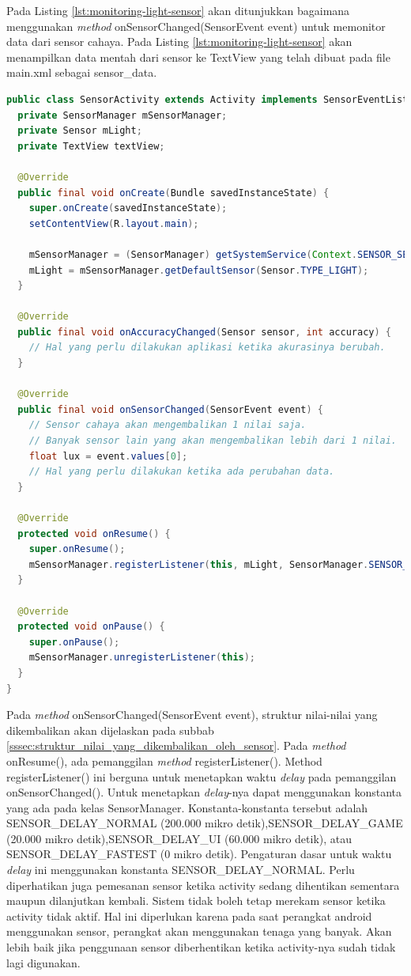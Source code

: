 Pada Listing \ref{lst:monitoring-light-sensor} akan ditunjukkan bagaimana menggunakan \textit{method} onSensorChanged(SensorEvent event) untuk memonitor data dari sensor cahaya. Pada Listing \ref{lst:monitoring-light-sensor} akan menampilkan data mentah dari sensor ke TextView yang telah dibuat pada file main.xml sebagai sensor\_data.
\begin{lstlisting}[caption={Contoh memonitor data mentah pada sensor cahaya},label={lst:monitoring-light-sensor},language=java]
public class SensorActivity extends Activity implements SensorEventListener {
  private SensorManager mSensorManager;
  private Sensor mLight;
  private TextView textView;

  @Override
  public final void onCreate(Bundle savedInstanceState) {
    super.onCreate(savedInstanceState);
    setContentView(R.layout.main);

    mSensorManager = (SensorManager) getSystemService(Context.SENSOR_SERVICE);
    mLight = mSensorManager.getDefaultSensor(Sensor.TYPE_LIGHT);
  }

  @Override
  public final void onAccuracyChanged(Sensor sensor, int accuracy) {
    // Hal yang perlu dilakukan aplikasi ketika akurasinya berubah.
  }

  @Override
  public final void onSensorChanged(SensorEvent event) {
    // Sensor cahaya akan mengembalikan 1 nilai saja.
    // Banyak sensor lain yang akan mengembalikan lebih dari 1 nilai.
    float lux = event.values[0];
    // Hal yang perlu dilakukan ketika ada perubahan data.
  }

  @Override
  protected void onResume() {
    super.onResume();
    mSensorManager.registerListener(this, mLight, SensorManager.SENSOR_DELAY_NORMAL);
  }

  @Override
  protected void onPause() {
    super.onPause();
    mSensorManager.unregisterListener(this);
  }
}
\end{lstlisting}
Pada \textit{method} onSensorChanged(SensorEvent event), struktur nilai-nilai yang dikembalikan akan dijelaskan pada subbab \ref{sssec:struktur_nilai_yang_dikembalikan_oleh_sensor}. Pada \textit{method} onResume(), ada pemanggilan \textit{method} registerListener(). Method registerListener() ini berguna untuk menetapkan waktu \textit{delay} pada pemanggilan onSensorChanged(). Untuk menetapkan \textit{delay}-nya dapat menggunakan konstanta yang ada pada kelas SensorManager. Konstanta-konstanta tersebut adalah SENSOR\_DELAY\_NORMAL (200.000 mikro detik),SENSOR\_DELAY\_GAME (20.000 mikro detik),SENSOR\_DELAY\_UI (60.000 mikro detik), atau SENSOR\_DELAY\_FASTEST (0 mikro detik). Pengaturan dasar untuk waktu \textit{delay} ini menggunakan konstanta SENSOR\_DELAY\_NORMAL.
Perlu diperhatikan juga pemesanan sensor ketika activity sedang dihentikan sementara maupun dilanjutkan kembali. Sistem tidak boleh tetap merekam sensor ketika activity tidak aktif. Hal ini diperlukan karena pada saat perangkat android menggunakan sensor, perangkat akan menggunakan tenaga yang banyak. Akan lebih baik jika penggunaan sensor diberhentikan ketika activity-nya sudah tidak lagi digunakan. 
